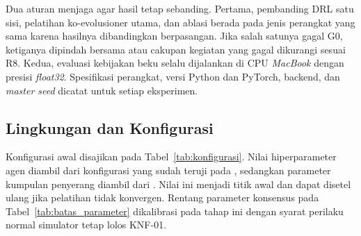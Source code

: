 Dua aturan menjaga agar hasil tetap sebanding. Pertama, pembanding DRL satu sisi, pelatihan ko-evolusioner utama, dan ablasi berada pada jenis perangkat yang sama karena hasilnya dibandingkan berpasangan. Jika salah satunya gagal G0, ketiganya dipindah bersama atau cakupan kegiatan yang gagal dikurangi sesuai R8. Kedua, evaluasi kebijakan beku selalu dijalankan di CPU \textit{MacBook} dengan presisi \textit{float32}. Spesifikasi perangkat, versi Python dan PyTorch, backend, dan \textit{master seed} dicatat untuk setiap eksperimen.

\subsection{Lingkungan dan Konfigurasi}
\label{subsec:konfigurasi}
Konfigurasi awal disajikan pada Tabel~\ref{tab:konfigurasi}. Nilai hiperparameter agen diambil dari konfigurasi yang sudah teruji pada \textcite{skowronski2026adaptive}, sedangkan parameter kumpulan penyerang diambil dari \textcite{wushishi2026coadam}. Nilai ini menjadi titik awal dan dapat disetel ulang jika pelatihan tidak konvergen. Rentang parameter konsensus pada Tabel~\ref{tab:batas_parameter} dikalibrasi pada tahap ini dengan syarat perilaku normal simulator tetap lolos KNF-01.


